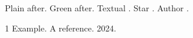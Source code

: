\documentclass{article}
\begin{document}
Plain \cite{one} after.
Green \citep[see][p.~2]{one} after. Textual \citet{one}. Star \citep*{one}. Author \citeauthor{one}.
\begin{thebibliography}{1}
 Example. A reference. 2024.
\end{thebibliography}
\end{document}
